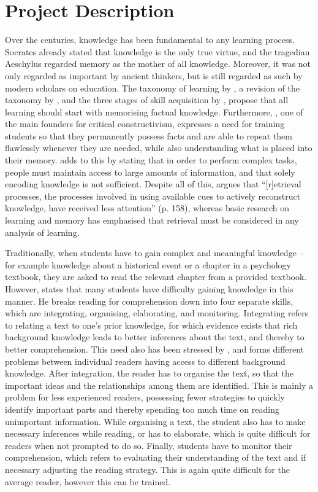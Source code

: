 \chapter{Project Description}

\label{ch:problem}

Over the centuries, knowledge has been fundamental to any learning process. Socrates already stated that knowledge is the only true virtue, and the tragedian Aeschylus regarded memory as the mother of all knowledge. Moreover, it was not only regarded as important by ancient thinkers, but is still regarded as such by modern scholars on education. The taxonomy of learning by , a revision of the taxonomy by , and the three stages of skill acquisition by , propose that all learning should start with memorising factual knowledge. Furthermore, , one of the main founders for critical constructivism, expresses a need for training students so that they permanently possess facts and are able to repeat them flawlessly whenever they are needed, while also understanding what is placed into their memory.  adds to this by stating that in order to perform complex tasks, people must maintain access to large amounts of information, and that solely encoding knowledge is not sufficient. Despite all of this,  argues that ``[r]etrieval processes, the processes involved in using available cues to actively reconstruct knowledge, have received less attention'' (p. 158), whereas basic research on learning and memory has emphasised that retrieval must be considered in any analysis of learning.

Traditionally, when students have to gain complex and meaningful knowledge -- for example knowledge about a historical event or a chapter in a psychology textbook, they are asked to read the relevant chapter from a provided textbook. However,  states that many students have difficulty gaining knowledge in this manner. He breaks reading for comprehension down into four separate skills, which are integrating, organising, elaborating, and monitoring. Integrating refers to relating a text to one's prior knowledge, for which evidence exists that rich background knowledge leads to better inferences about the text, and thereby to better comprehension. This need also has been stressed by , and forms different problems between individual readers having access to different background knowledge. After integration, the reader has to organise the text, so that the important ideas and the relationships among them are identified. This is mainly a problem for less experienced readers, possessing fewer strategies to quickly identify important parts and thereby spending too much time on reading unimportant information. While organising a text, the student also has to make necessary inferences while reading, or has to elaborate, which is quite difficult for readers when not prompted to do so. Finally, students have to monitor their comprehension, which refers to evaluating their understanding of the text and if necessary adjusting the reading strategy. This is again quite difficult for the average reader, however this can be trained.

